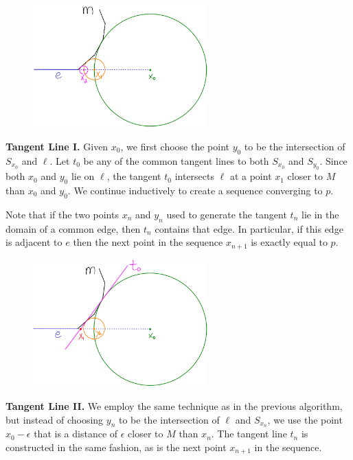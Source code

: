 \documentclass[12pt]{article}
\begin{document}
\begin{flushleft}
\begin{figure}[H]
	\centering
	\includegraphics[width=0.6\textwidth]{binary.png}
\end{figure}

\textbf{Tangent Line I.}
Given $x_0$, we first choose the point $y_0$ to be the intersection of $S_{x_0}$ and $\ell$.
Let $t_{0}$ be any of the common tangent lines to both $S_{x_0}$ and $S_{y_0}$.
Since both $x_0$ and $y_0$ lie on $\ell$, the tangent $t_{0}$ intersects $\ell$ at a point $x_1$ closer to $M$ than $x_0$ and $y_0$.
We continue inductively to create a sequence converging to $p$.

Note that if the two points $x_n$ and $y_n$ used to generate the tangent $t_n$ lie in the domain of a common edge, then $t_n$ contains that edge.
In particular, if this edge is adjacent to $e$ then the next point in the sequence $x_{n+1}$ is exactly equal to $p$.

\begin{figure}[H]
	\centering
	\includegraphics[width=0.6\textwidth]{tangent.png}
\end{figure}

\textbf{Tangent Line II.}
We employ the same technique as in the previous algorithm, but instead of choosing $y_n$ to be the intersection of $\ell$ and $S_{x_n}$, we use the point $x_0-\epsilon$ that is a distance of $\epsilon$ closer to $M$ than $x_n$.
The tangent line $t_n$ is constructed in the same fashion, as is the next point $x_{n+1}$ in the sequence.


\end{flushleft}
\end{document}
